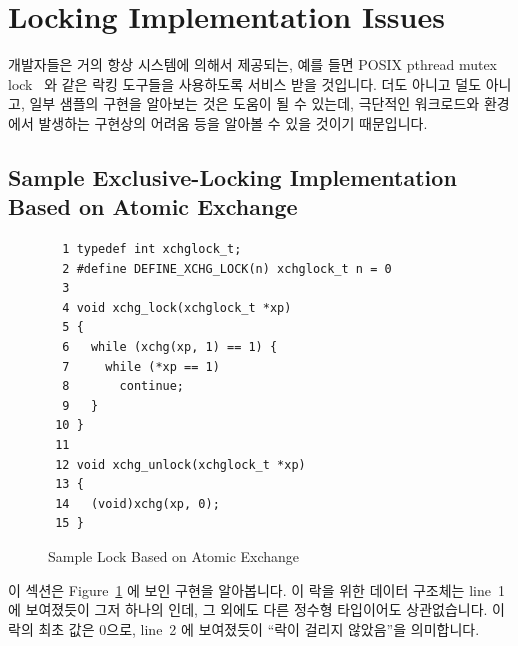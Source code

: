 \section{Locking Implementation Issues}
\label{sec:locking:Locking Implementation Issues}

개발자들은 거의 항상 시스템에 의해서 제공되는, 예를 들면 POSIX pthread mutex
lock~\cite{OpenGroup1997pthreads,Butenhof1997pthreads} 와 같은 락킹 도구들을
사용하도록 서비스 받을 것입니다.
더도 아니고 덜도 아니고, 일부 샘플의 구현을 알아보는 것은 도움이 될 수 있는데,
극단적인 워크로드와 환경에서 발생하는 구현상의 어려움 등을 알아볼 수 있을
것이기 때문입니다.

\subsection{Sample Exclusive-Locking Implementation Based on Atomic Exchange}
\label{sec:locking:Sample Exclusive-Locking Implementation Based on Atomic Exchange}

\begin{figure}[tbp]
{ \scriptsize
\begin{verbatim}
  1 typedef int xchglock_t;
  2 #define DEFINE_XCHG_LOCK(n) xchglock_t n = 0
  3 
  4 void xchg_lock(xchglock_t *xp)
  5 {
  6   while (xchg(xp, 1) == 1) {
  7     while (*xp == 1)
  8       continue;
  9   }
 10 }
 11 
 12 void xchg_unlock(xchglock_t *xp)
 13 {
 14   (void)xchg(xp, 0);
 15 }
\end{verbatim}
}
\caption{Sample Lock Based on Atomic Exchange}
\label{fig:locking:Sample Lock Based on Atomic Exchange}
\end{figure}

이 섹션은
Figure~\ref{fig:locking:Sample Lock Based on Atomic Exchange} 에 보인 구현을
알아봅니다.
이 락을 위한 데이터 구조체는 line~1 에 보여졌듯이 그저 하나의  인데, 그
외에도 다른 정수형 타입이어도 상관없습니다.
이 락의 최초 값은 0으로, line~2 에 보여졌듯이 ``락이 걸리지 않았음''을
의미합니다.

